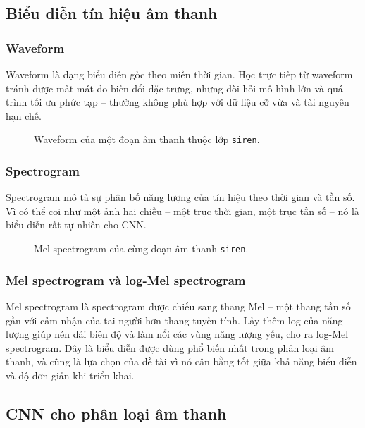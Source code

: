 \subsection{Biểu diễn tín hiệu âm thanh}

\subsubsection{Waveform}

Waveform là dạng biểu diễn gốc theo miền thời gian. Học trực tiếp từ waveform
tránh được mất mát do biến đổi đặc trưng, nhưng đòi hỏi mô hình lớn và quá trình
tối ưu phức tạp -- thường không phù hợp với dữ liệu cỡ vừa và tài nguyên hạn chế.

\begin{figure}[H]
  \centering
  \caption{Waveform của một đoạn âm thanh thuộc lớp \texttt{siren}.}
  \label{fig:wave}
\end{figure}

\subsubsection{Spectrogram}

Spectrogram mô tả sự phân bố năng lượng của tín hiệu theo thời gian và tần số.
Vì có thể coi như một ảnh hai chiều -- một trục thời gian, một trục tần số -- nó
là biểu diễn rất tự nhiên cho CNN.

\begin{figure}[H]
  \centering
  \caption{Mel spectrogram của cùng đoạn âm thanh \texttt{siren}.}
  \label{fig:spec}
\end{figure}

\subsubsection{Mel spectrogram và log-Mel spectrogram}

Mel spectrogram là spectrogram được chiếu sang thang Mel -- một thang tần số gần
với cảm nhận của tai người hơn thang tuyến tính. Lấy thêm log của năng lượng giúp
nén dải biên độ và làm nổi các vùng năng lượng yếu, cho ra log-Mel spectrogram.
Đây là biểu diễn được dùng phổ biến nhất trong phân loại âm thanh, và cũng là lựa
chọn của đề tài vì nó cân bằng tốt giữa khả năng biểu diễn và độ đơn giản khi
triển khai.

\subsection{CNN cho phân loại âm thanh}

